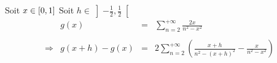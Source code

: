 Soit $x \in [0, 1]\\$
  Soit $h \in \left]-\frac{1}{2}, \frac{1}{2}\right[$
\[
  \begin{array}{crcl}
                & g(x)          & = & \sum\limits_{n=2}^{+\infty}{\frac{2x}{n^2-x^2}} \\\\
    \Rightarrow & g(x+h) - g(x) & = & 2\sum\limits_{n=2}^{+\infty}{\left(
    \frac{x+h}{n^2-(x+h)^2}
    -
    \frac{x}{n^2-x^2}
    \right)}                                                                          \\\\
  \end{array}
\]
